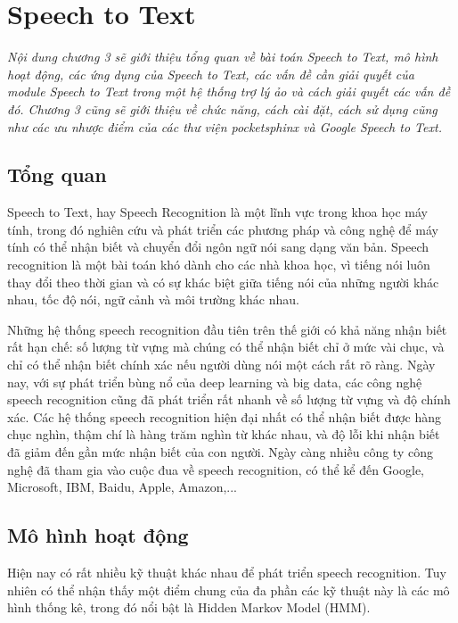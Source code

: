 \chapter{Speech to Text}
\ifpdf
    \graphicspath{{Chapter3/Chapter3Figs/PNG/}{Chapter3/Chapter3Figs/PDF/}{Chapter3/Chapter3Figs/}}
\else
    \graphicspath{{Chapter3/Chapter3Figs/EPS/}{Chapter3/Chapter3Figs/}}
\fi

\textit{Nội dung chương 3 sẽ giới thiệu tổng quan về bài toán Speech to Text, mô hình hoạt động, các ứng dụng của Speech to Text, các vấn đề cần giải quyết của module Speech to Text trong một hệ thống trợ lý ảo và cách giải quyết các vấn đề đó. Chương 3 cũng sẽ giới thiệu về chức năng, cách cài đặt, cách sử dụng cũng như các ưu nhược điểm của các thư viện pocketsphinx và Google Speech to Text.}

\section{Tổng quan}

Speech to Text, hay Speech Recognition là một lĩnh vực trong khoa học máy tính, trong đó nghiên cứu và phát triển các phương pháp và công nghệ để máy tính có thể nhận biết và chuyển đổi ngôn ngữ nói sang dạng văn bản. Speech recognition là một bài toán khó dành cho các nhà khoa học, vì tiếng nói luôn thay đổi theo thời gian và có sự khác biệt giữa tiếng nói của những người khác nhau, tốc độ nói, ngữ cảnh và môi trường khác nhau.

Những hệ thống speech recognition đầu tiên trên thế giới có khả năng nhận biết rất hạn chế: số lượng từ vựng mà chúng có thể nhận biết chỉ ở mức vài chục, và chỉ có thể nhận biết chính xác nếu người dùng nói một cách rất rõ ràng. Ngày nay, với sự phát triển bùng nổ của deep learning và big data, các công nghệ speech recognition cũng đã phát triển rất nhanh về số lượng từ vựng và độ chính xác. Các hệ thống speech recognition hiện đại nhất có thể nhận biết được hàng chục nghìn, thậm chí là hàng trăm nghìn từ khác nhau, và độ lỗi khi nhận biết đã giảm đến gần mức nhận biết của con người. Ngày càng nhiều công ty công nghệ đã tham gia vào cuộc đua về speech recognition, có thể kể đến Google, Microsoft, IBM, Baidu, Apple, Amazon,...

\section{Mô hình hoạt động}

Hiện nay có rất nhiều kỹ thuật khác nhau để phát triển speech recognition. Tuy nhiên có thể nhận thấy một điểm chung của đa phần các kỹ thuật này là các mô hình thống kê, trong đó nổi bật là Hidden Markov Model (HMM).

